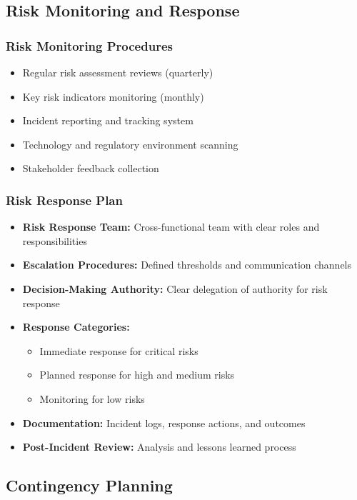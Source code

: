 \subsection{Risk Monitoring and Response}

\subsubsection{Risk Monitoring Procedures}
\begin{itemize}
    \item Regular risk assessment reviews (quarterly)
    \item Key risk indicators monitoring (monthly)
    \item Incident reporting and tracking system
    \item Technology and regulatory environment scanning
    \item Stakeholder feedback collection
\end{itemize}

\subsubsection{Risk Response Plan}
\begin{itemize}
    \item \textbf{Risk Response Team:} Cross-functional team with clear roles and responsibilities
    \item \textbf{Escalation Procedures:} Defined thresholds and communication channels
    \item \textbf{Decision-Making Authority:} Clear delegation of authority for risk response
    \item \textbf{Response Categories:}
    \begin{itemize}
        \item Immediate response for critical risks
        \item Planned response for high and medium risks
        \item Monitoring for low risks
    \end{itemize}
    \item \textbf{Documentation:} Incident logs, response actions, and outcomes
    \item \textbf{Post-Incident Review:} Analysis and lessons learned process
\end{itemize}

\subsection{Contingency Planning}

